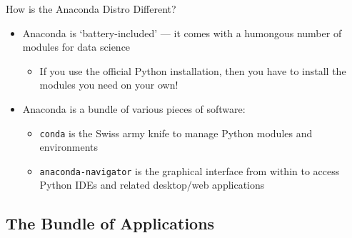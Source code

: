 \documentclass[aspectratio=1610]{beamer}
\begin{document}
\begin{frame}[c]{How is the Anaconda Distro Different?}
	\begin{itemize}
		\item Anaconda is `battery-included' --- it comes with a humongous number of modules for data science
		\begin{itemize}
			\item If you use the official Python installation, then you have to install the modules you need on your own!
		\end{itemize}
		\item  Anaconda is a bundle of various pieces of software:
		\begin{itemize}
			\item \texttt{conda} is the Swiss army knife to manage Python modules and environments
			\item \texttt{anaconda-navigator} is the graphical interface from within to access Python IDEs and related desktop/web applications
		\end{itemize}
	\end{itemize}
\end{frame}

\subsection{The Bundle of Applications}
\end{document}
